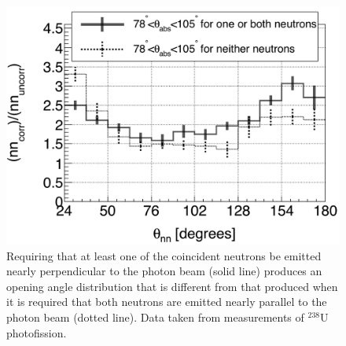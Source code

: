 \begin{figure}
\includegraphics[width=\figsize\textwidth]{theta_abs_two-neutron.png}
\caption{Requiring that at least one of the coincident neutrons be emitted nearly perpendicular to the photon beam (solid line) produces an opening angle distribution that is different from that produced when it is required that both neutrons are emitted nearly parallel to the photon beam (dotted line).
Data taken from measurements of $^{238}$U photofission.}
\label{fig:theta_abs_two_neutron}
\end{figure}